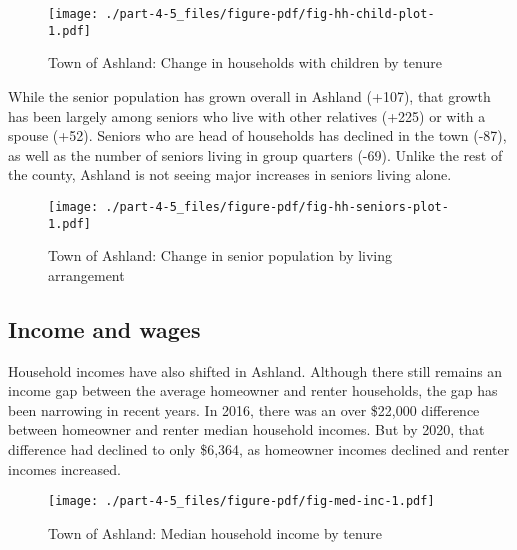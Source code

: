 \documentclass[
  letterpaper,
  DIV=11,
  numbers=noendperiod]{scrreprt}
\begin{document}
\begin{figure}

{\centering \texttt{[image: ./part-4-5\_files/figure-pdf/fig-hh-child-plot-1.pdf]}

}

\caption{\label{fig-hh-child-plot}Town of Ashland: Change in households
with children by tenure}

\end{figure}

While the senior population has grown overall in Ashland (+107), that
growth has been largely among seniors who live with other relatives
(+225) or with a spouse (+52). Seniors who are head of households has
declined in the town (-87), as well as the number of seniors living in
group quarters (-69). Unlike the rest of the county, Ashland is not
seeing major increases in seniors living alone.

\begin{figure}

{\centering \texttt{[image: ./part-4-5\_files/figure-pdf/fig-hh-seniors-plot-1.pdf]}

}

\caption{\label{fig-hh-seniors-plot}Town of Ashland: Change in senior
population by living arrangement}

\end{figure}

\hypertarget{income-and-wages-4}{%
\subsection{Income and wages}\label{income-and-wages-4}}

Household incomes have also shifted in Ashland. Although there still
remains an income gap between the average homeowner and renter
households, the gap has been narrowing in recent years. In 2016, there
was an over \$22,000 difference between homeowner and renter median
household incomes. But by 2020, that difference had declined to only
\$6,364, as homeowner incomes declined and renter incomes increased.

\begin{figure}

{\centering \texttt{[image: ./part-4-5\_files/figure-pdf/fig-med-inc-1.pdf]}

}

\caption{\label{fig-med-inc}Town of Ashland: Median household income by
tenure}

\end{figure}
\end{document}
